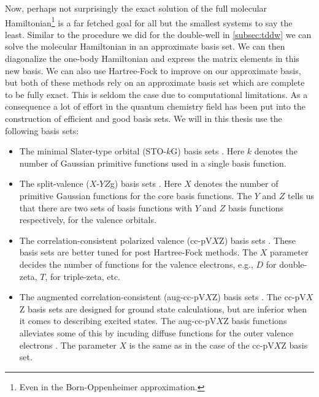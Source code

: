         Now, perhaps not surprisingly the exact solution of the full molecular
        Hamiltonian\footnote{%
            Even in the Born-Oppenheimer approximation.
        } is a far fetched goal for all but the smallest systems to say the
        least.
        Similar to the procedure we did for the double-well in
        \autoref{subsec:tddw} we can solve the molecular Hamiltonian in an
        approximate basis set.
        We can then diagonalize the one-body Hamiltonian and express the
        matrix elements in this new basis.
        We can also use Hartree-Fock to improve on our approximate basis, but
        both of these methods rely on an approximate basis set which are
        complete to be fully exact.
        This is seldom the case due to computational limitations.
        As a consequence a lot of effort in the quantum chemistry field has been
        put into the construction of efficient and good basis sets.
        We will in this thesis use the following basis sets:
        \begin{itemize}
            \item The minimal Slater-type orbital (STO-$k$G) basis sets
                \cite{sto-3g, helgaker-molecular}.
                Here $k$ denotes the number of Gaussian primitive functions used
                in a single basis function.
            \item The split-valence ($X$-$YZ$g) basis sets \cite{x-yzg,
                helgaker-molecular}.
                Here $X$ denotes the number of primitive Gaussian functions for
                the core basis functions.
                The $Y$ and $Z$ tells us that there are two sets of basis
                functions with $Y$ and $Z$ basis functions respectively, for the
                valence orbitals.
            \item The correlation-consistent polarized valence (cc-pV$X$Z) basis
                sets \cite{cc-pVXZ, helgaker-molecular}.
                These basis sets are better tuned for post Hartree-Fock methods.
                The $X$ parameter decides the number of functions for the
                valence electrons, e.g., $D$ for double-zeta, $T$, for
                triple-zeta, etc.
            \item The augmented correlation-consistent (aug-cc-pV$X$Z) basis
                sets \cite{aug-cc-pVXZ, helgaker-molecular}.
                The cc-pV$X$Z basis sets are designed for ground state
                calculations, but are inferior when it comes to describing
                excited states.
                The aug-cc-pV$X$Z basis functions alleviates some of this by
                incuding diffuse functions for the outer valence electrons
                \cite{helgaker-molecular}.
                The parameter $X$ is the same as in the case of the cc-pV$X$Z
                basis set.
        \end{itemize}
